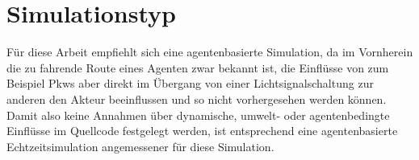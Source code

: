 %


\section{Simulationstyp}\label{sec:simulationtype}

Für diese Arbeit empfiehlt sich eine agentenbasierte Simulation, da im Vornherein die zu fahrende Route eines Agenten zwar bekannt ist, die Einflüsse von zum Beispiel Pkws aber direkt im Übergang von einer Lichtsignalschaltung zur anderen den Akteur beeinflussen und so nicht vorhergesehen werden können.
Damit also keine Annahmen über dynamische, umwelt- oder agentenbedingte Einflüsse im Quellcode festgelegt werden, ist entsprechend eine agentenbasierte Echtzeitsimulation angemessener für diese Simulation.

